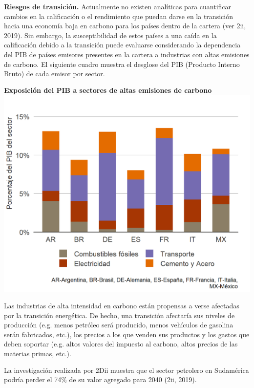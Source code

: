 \documentclass[10pt,table]{article}\usepackage[]{graphicx}\usepackage[]{color}
\begin{document}
	
	\begin{multicols}{2}
	\textbf{Riesgos de transición.} Actualmente no existen analíticas para cuantificar cambios en la calificación o el rendimiento que puedan darse en la transición hacia una economía baja en carbono para los países dentro de la cartera (ver 2ii, 2019). Sin embargo, la susceptibilidad de estos países a una caída en la calificación debido a la transición puede evaluarse considerando la dependencia del PIB de países emisores presentes en la cartera a industrias con altas emisiones de carbono. El siguiente cuadro muestra el desglose del PIB (Producto Interno Bruto) de cada emisor por sector.	
	
		
		\textbf{Exposición del PIB a sectores de altas emisiones de carbono} \\
		\includegraphics[trim = {0, 0, 0, 0cm},width=1\linewidth]{ReportOutputs/Fig93}
	
	Las industrias de alta intensidad en carbono están propensas a verse afectadas por la transición energética. De hecho, una transición afectaría sus niveles de producción (e.g. menos petróleo será producido, menos vehículos de gasolina serán fabricados, etc.), los precios a los que venden sus productos y los gastos que deben soportar (e.g. altos valores del impuesto  al carbono, altos precios de las materias primas, etc.).
	
	La investigación realizada por 2Dii muestra que el sector petrolero en Sudamérica podría perder el 74\% de su valor agregado para 2040 (2ii, 2019).


\end{multicols}
\end{document}
